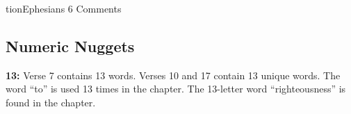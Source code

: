 tion{Ephesians 6 Comments}

\subsection{Numeric Nuggets}
\textbf{13:} Verse 7 contains 13 words. Verses 10 and 17 contain 13 unique words. The word ``to'' is used 13 times in the chapter. The 13-letter  word ``righteousness'' is found in the chapter.